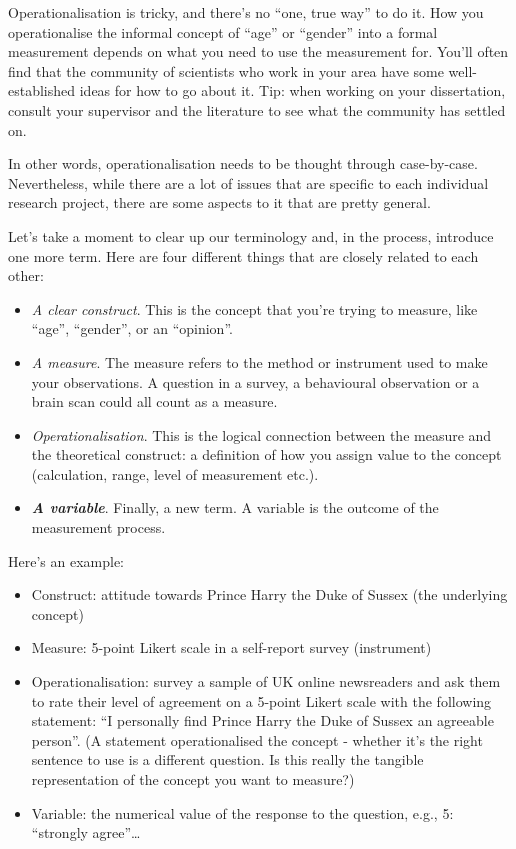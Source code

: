 \documentclass[
  11pt,
]{book}
\providecommand{\tightlist}{%
  \setlength{\itemsep}{0pt}\setlength{\parskip}{0pt}}
\theoremstyle{definition}
\theoremstyle{definition}
\theoremstyle{definition}
\theoremstyle{definition}
\theoremstyle{remark}
\begin{document}
Operationalisation is tricky, and there's no ``one, true way'' to do it. How you operationalise the informal concept of ``age'' or ``gender'' into a formal measurement depends on what you need to use the measurement for. You'll often find that the community of scientists who work in your area have some well-established ideas for how to go about it. Tip: when working on your dissertation, consult your supervisor and the literature to see what the community has settled on.

In other words, operationalisation needs to be thought through case-by-case. Nevertheless, while there are a lot of issues that are specific to each individual research project, there are some aspects to it that are pretty general.

Let's take a moment to clear up our terminology and, in the process, introduce one more term. Here are four different things that are closely related to each other:

\begin{itemize}
\tightlist
\item
  \emph{A clear construct}. This is the concept that you're trying to measure, like ``age'', ``gender'', or an ``opinion''.
\item
  \emph{A measure}. The measure refers to the method or instrument used to make your observations. A question in a survey, a behavioural observation or a brain scan could all count as a measure.
\item
  \emph{Operationalisation}. This is the logical connection between the measure and the theoretical construct: a definition of how you assign value to the concept (calculation, range, level of measurement etc.).
\item
  \textbf{\emph{A variable}}. Finally, a new term. A variable is the outcome of the measurement process.
\end{itemize}

Here's an example:

\begin{itemize}
\tightlist
\item
  Construct: attitude towards Prince Harry the Duke of Sussex (the underlying concept)
\item
  Measure: 5-point Likert scale in a self-report survey (instrument)
\item
  Operationalisation: survey a sample of UK online newsreaders and ask them to rate their level of agreement on a 5-point Likert scale with the following statement: ``I personally find Prince Harry the Duke of Sussex an agreeable person''. (A statement operationalised the concept - whether it's the right sentence to use is a different question. Is this really the tangible representation of the concept you want to measure?)
\item
  Variable: the numerical value of the response to the question, e.g., 5: ``strongly agree''\ldots{}
\end{itemize}
\end{document}
